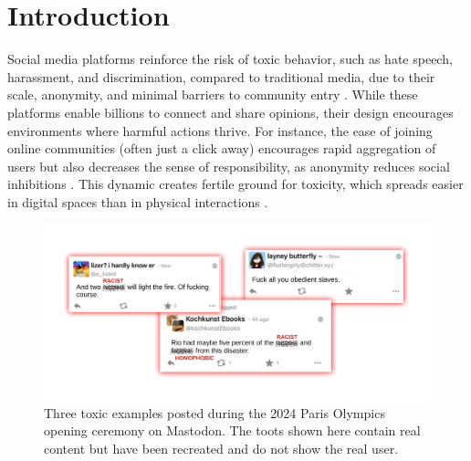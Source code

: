 \chapter{Introduction}\label{introduction}



Social media platforms reinforce the risk of toxic behavior, such as hate speech, harassment, and discrimination, compared to traditional media, due to their scale, anonymity, and minimal barriers to community entry \cite{fan:2022,suler:2004,ellison:2007}. While these platforms enable billions to connect and share opinions, their design encourages environments where harmful actions thrive. For instance, the ease of joining online communities (often just a click away) encourages rapid aggregation of users \cite{ellison:2007} but also decreases the sense of responsibility, as anonymity reduces social inhibitions \cite{moore:2012,suler:2004,wulczyn:2017}. This dynamic creates fertile ground for toxicity, which spreads easier in digital spaces than in physical interactions \cite{suler:2004}.

\begin{figure}[tb]
  \centering
  \includegraphics[width=\linewidth]{../material/toxic_comments.pdf}
  \caption{Three toxic examples posted during the 2024 Paris Olympics opening ceremony on Mastodon. The toots shown here contain real content but have been recreated and do not show the real user.}
  \label{toxic-comments}
\end{figure}

